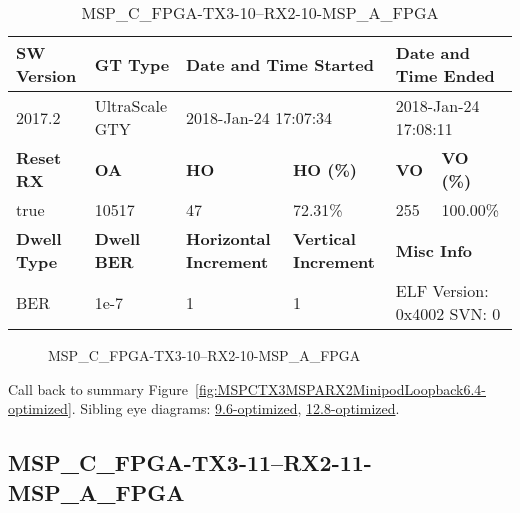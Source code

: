 \begin{table}[h]
\centering
\caption{MSP\_C\_FPGA-TX3-10--RX2-10-MSP\_A\_FPGA}
\label{tab:MSPCFPGATX310RX210MSPAFPGA6.4-optimized}
\begin{tabular}{@{}|l|l|l|l|l|l|@{}}
\toprule
\textbf{SW Version}                & \textbf{GT Type}   & \multicolumn{2}{l|}{\textbf{Date and Time Started}}            & \multicolumn{2}{l|}{\textbf{Date and Time Ended}}        \\ \midrule
2017.2                       & UltraScale GTY          & \multicolumn{2}{l|}{2018-Jan-24 17:07:34}                   & \multicolumn{2}{l|}{2018-Jan-24 17:08:11}               \\ \midrule
\textbf{Reset RX}                  & \textbf{OA} & \textbf{HO}   & \textbf{HO (\%)} & \textbf{VO} & \textbf{VO (\%)} \\ \midrule
true & 10517        & 47          & 72.31\%        & 255        & 100.00\%       \\ \midrule
\textbf{Dwell Type}                & \textbf{Dwell BER} & \textbf{Horizontal Increment} & \textbf{Vertical Increment}    & \multicolumn{2}{l|}{\textbf{Misc Info}}                  \\ \midrule
BER                            & 1e-7        & 1        & 1           & \multicolumn{2}{l|}{ELF Version: 0x4002 SVN: 0}                         \\ \bottomrule
\end{tabular}
\end{table}

\begin{figure}[h]
\caption{MSP\_C\_FPGA-TX3-10--RX2-10-MSP\_A\_FPGA} \label{fig:MSPCFPGATX310RX210MSPAFPGA6.4-optimized}
\end{figure}

Call back to summary Figure~\ref{fig:MSPCTX3MSPARX2MinipodLoopback6.4-optimized}.
Sibling eye diagrams: \hyperref[sec:MSPCFPGATX310RX210MSPAFPGA9.6-optimized]{9.6-optimized}, \hyperref[sec:MSPCFPGATX310RX210MSPAFPGA12.8-optimized]{12.8-optimized}.

\clearpage
\newpage


\subsection{MSP\_C\_FPGA-TX3-11--RX2-11-MSP\_A\_FPGA}\label{sec:MSPCFPGATX311RX211MSPAFPGA6.4-optimized}

